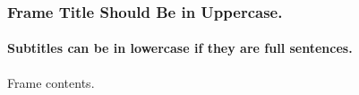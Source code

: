 \documentclass[c]{beamer}
\begin{document}
\begin{frame}
  \frametitle<presentation>{Frame Title Should Be in Uppercase.}
  \framesubtitle{Subtitles can be in lowercase if they are full sentences.}

  Frame contents.
\end{frame}
\end{document}
